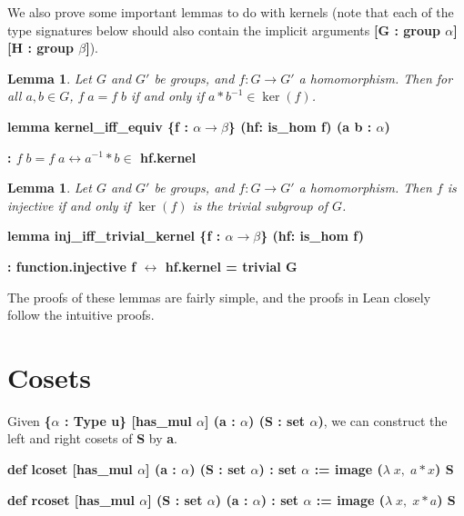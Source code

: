\documentclass[runningheads,a4paper]{llncs}
\renewcommand{\a}{\alpha}
\renewcommand{\b}{\beta}
\renewcommand{\l}{\lambda}
\renewcommand{\-}{\setminus}
\newtheorem{lemma}[theorem]{Lemma}
\begin{document}
We also prove some important lemmas to do with kernels (note that each of the type signatures below should also contain the implicit arguments \textbf{[G : group $\a$] [H : group $\b$]}).

\begin{lemma}
Let $G$ and $G'$ be groups, and $f: G \to G'$ a homomorphism. Then for all $a,b \in G$, $f\; a = f\; b$ if and only if $a * b^{-1} \in \ker (f)$.
\end{lemma}

\vspace{2 mm}
\hspace{2 em}\textbf{lemma kernel\_iff\_equiv \{f : $\a \to \b$\} (hf: is\_hom f) (a b : $\a$)}

\hspace{4 em}\textbf{: $f\; b = f\; a \leftrightarrow a^{-1} * b \in$ hf.kernel}
\vspace{2 mm}

\begin{lemma}
Let $G$ and $G'$ be groups, and $f: G \to G'$ a homomorphism. Then $f$ is injective if and only if $\ker (f)$ is the trivial subgroup of $G$. 
\end{lemma}

\vspace{2 mm}
\hspace{2 em}\textbf{lemma inj\_iff\_trivial\_kernel \{f : $\a \to \b$\} (hf: is\_hom f)}

\hspace{4 em}\textbf{: function.injective f $\leftrightarrow$ hf.kernel = trivial G}
\vspace{2 mm}

The proofs of these lemmas are fairly simple, and the proofs in Lean closely follow the intuitive proofs.

\section{Cosets}

Given \textbf{\{$\a$ : Type u\} [has\_mul $\a$] (a : $\a$) (S : set $\a$)}, we can construct the left and right cosets of \textbf{S} by \textbf{a}.

\vspace{2 mm}
\hspace{2 em}\textbf{def lcoset [has\_mul $\a$] (a : $\a$) (S : set $\a$) : set $\a$ := image ($\l\; x,\; a * x$) S}

\hspace{2 em}\textbf{def rcoset [has\_mul $\a$] (S : set $\a$) (a : $\a$)  : set $\a$ := image ($\l\; x,\; x * a$) S}
\vspace{2 mm}
\end{document}
